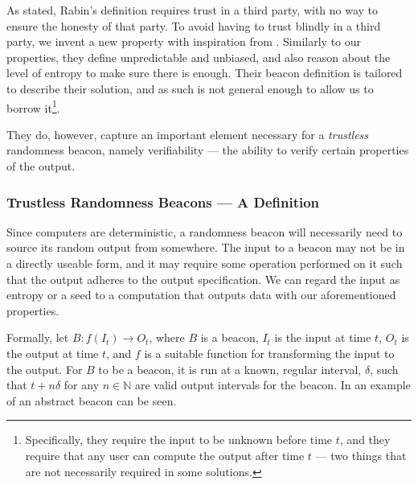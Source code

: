 As stated, Rabin's definition requires trust in a third party, with no way to ensure the honesty of that party.
To avoid having to trust blindly in a third party, we invent a new property with inspiration from \citet{bonneau2015bitcoin}.
Similarly to our properties, they define unpredictable and unbiased, and also reason about the level of entropy to make sure there is enough. Their beacon definition is tailored to describe their solution, and as such is not general enough to allow us to borrow it\footnote{Specifically, they require the input to be unknown before time $t$, and they require that any user can compute the output after time $t$ --- two things that are not necessarily required in some solutions.}.

They do, however, capture an important element necessary for a \emph{trustless} randomness beacon, namely verifiability --- the ability to verify certain properties of the output.



\subsubsection{Trustless Randomness Beacons --- A Definition}

Since computers are deterministic, a randomness beacon will necessarily need to source its random output from somewhere. The input to a beacon may not be in a directly useable form, and it may require some operation performed on it such that the output adheres to the output specification. We can regard the input as entropy or a seed to a computation that outputs data with our aforementioned properties.

Formally, let $B: f(I_t) \rightarrow O_t$, where $B$ is a beacon, $I_t$ is the input at time $t$, $O_t$ is the output at time $t$, and $f$ is a suitable function for transforming the input to the output.
For $B$ to be a beacon, it is run at a known, regular interval, $\delta$, such that $t+n\delta$ for any $n \in \mathbb{N}$ are valid output intervals for the beacon.
In  an example of an abstract beacon can be seen.

